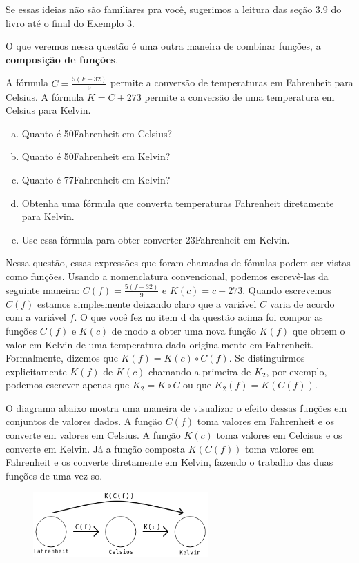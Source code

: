 \documentclass[main_estudante.tex]{subfiles}
\begin{document}
Se essas ideias não são familiares pra você, sugerimos a leitura das seção 3.9 do livro  até o final do Exemplo 3.

O que veremos nessa questão é uma outra maneira de combinar funções, a \textbf{composição de funções}.

\begin{questao}
A fórmula $C=\frac{5(F-32)}{9}$ permite a conversão de temperaturas em Fahrenheit para Celsius. A fórmula $K=C+273$ permite a conversão de uma temperatura em Celsius para Kelvin.
\begin{enumerate}[a)]
\item Quanto é 50\degree Fahrenheit em Celsius?
\item Quanto é 50\degree Fahrenheit em Kelvin?
\item Quanto é 77\degree Fahrenheit em Kelvin?
\item Obtenha uma fórmula que converta temperaturas Fahrenheit diretamente para Kelvin.
\item Use essa fórmula para obter converter 23\degree Fahrenheit em Kelvin.
\end{enumerate}
\end{questao}

Nessa questão, essas expressões que foram chamadas de fómulas podem ser vistas como funções. Usando a nomenclatura convencional, podemos escrevê-las da seguinte maneira: $C(f)=\frac{5(f-32)}{9}$ e $K(c)=c+273$. Quando escrevemos $C(f)$ estamos simplesmente deixando claro que a variável $C$ varia de acordo com a variável $f$. O que você fez no item d da questão acima foi compor as funções $C(f)$ e $K(c)$ de modo a obter uma nova função $K(f)$ que obtem o valor em Kelvin de uma temperatura dada originalmente em Fahrenheit.
Formalmente, dizemos que $K(f) = K(c) \circ C(f)$. Se distinguirmos explicitamente $K(f)$ de $K(c)$ chamando a primeira de $K_2$, por exemplo, podemos escrever apenas que $K_2=K \circ C$ ou que $K_2(f) = K(C(f))$.

O diagrama abaixo mostra uma maneira de visualizar o efeito dessas funções em conjuntos de valores dados. A função $C(f)$ toma valores em Fahrenheit e os converte em valores em Celsius. A função $K(c)$ toma valores em Celcisus e os converte em Kelvin. Já a função composta $K(C(f))$ toma valores em Fahrenheit e os converte diretamente em Kelvin, fazendo o trabalho das duas funções de uma vez so.

\begin{figure}[h]
\centering
\includegraphics[width=0.6\textwidth]{./img/c5q5.png}
\end{figure}
\end{document}

